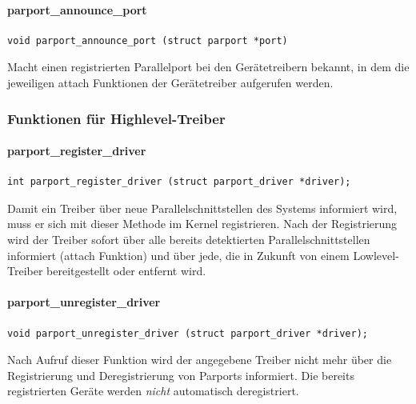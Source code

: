 \documentclass[a4paper,11pt]{article}
\begin{document}
\paragraph{parport\_announce\_port}
\begin{verbatim}
void parport_announce_port (struct parport *port)
\end{verbatim}

Macht einen registrierten Parallelport bei den Gerätetreibern bekannt, in dem die jeweiligen
attach Funktionen der Gerätetreiber aufgerufen werden.

\subsubsection{Funktionen für Highlevel-Treiber}

\paragraph{parport\_register\_driver}

\begin{verbatim}
int parport_register_driver (struct parport_driver *driver);
\end{verbatim}

Damit ein Treiber über neue Parallelschnittstellen des Systems informiert wird, muss er
sich mit dieser Methode im Kernel registrieren. Nach der Registrierung wird der Treiber
sofort über alle bereits detektierten Parallelschnittstellen informiert (attach Funktion)
und über jede, die in Zukunft von einem Lowlevel-Treiber bereitgestellt oder entfernt wird.

\paragraph{parport\_unregister\_driver}

\begin{verbatim}
void parport_unregister_driver (struct parport_driver *driver);
\end{verbatim}

Nach Aufruf dieser Funktion wird der angegebene Treiber nicht mehr über die Registrierung
und Deregistrierung von Parports informiert. Die bereits registrierten Geräte werden \emph{nicht}
automatisch deregistriert.

\end{document}
